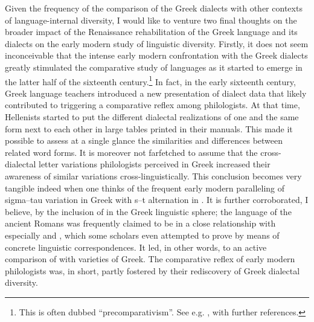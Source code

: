 Given the frequency of the comparison of the Greek dialects with other contexts of language-internal diversity, I would like to venture two final thoughts on the broader impact of the Renaissance rehabilitation of the Greek language and its dialects on the early modern study of linguistic diversity. Firstly, it does not seem inconceivable that the intense early modern confrontation with the Greek dialects greatly stimulated the comparative study of languages as it started to emerge in the latter half of the sixteenth century.\footnote{This is often dubbed “precomparativism”. See e.g. \citet{Considine2010b}, with further references.} In fact, in the early sixteenth century, Greek language teachers introduced a new presentation of dialect data that likely contributed to triggering a comparative reflex among philologists. At that time, Hellenists started to put the different dialectal realizations of one and the same form next to each other in large tables printed in their manuals. This made it possible to assess at a single glance the similarities and differences between related word forms. It is moreover not farfetched to assume that the cross-dialectal letter variations philologists perceived in Greek increased their awareness of similar variations cross-linguistically. This conclusion becomes very tangible indeed when one thinks of the frequent early modern paralleling of sigma–tau variation in Greek with s–t alternation in . It is further corroborated, I believe, by the inclusion of  in the Greek linguistic sphere; the language of the ancient Romans was frequently claimed to be in a close relationship with especially  and , which some scholars even attempted to prove by means of concrete linguistic correspondences. It led, in other words, to an active comparison of  with varieties of Greek. The comparative reflex of early modern philologists was, in short, partly fostered by their rediscovery of Greek dialectal diversity.

